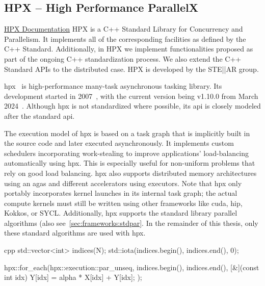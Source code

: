 \subsection{HPX -- High Performance ParallelX}
\label{sec:frameworks:hpx}

\begin{quotebox}{\href{https://hpx-docs.stellar-group.org/latest/html/index.html\#what-is-hpx}{HPX Documentation}}
    HPX is a C++ Standard Library for Concurrency and Parallelism. It implements all of the corresponding facilities as defined by the C++ Standard. Additionally, in HPX we implement functionalities proposed as part of the ongoing C++ standardization process. We also extend the C++ Standard APIs to the distributed case. HPX is developed by the STE||AR group.
\end{quotebox}

\acrfull{hpx}~\cite{kaiser_hpx_2020} is high-performance many-task asynchronous tasking library. 
Its development started in 2007~\cite{the_stear_group_history_nodate}, with the current version being v1.10.0 from March 2024~\cite{kaiser_stellar-grouphpx_2024}.
Although \gls{hpx} is not standardized where possible, its \gls{api} is closely modeled after the \cpp standard \gls{api}. 

The execution model of \gls{hpx} is based on a task graph that is implicitly built in the source code and later executed asynchronously. 
It implements custom schedulers incorporating work-stealing to improve applications' load-balancing automatically using \gls{hpx}. 
This is especially useful for non-uniform problems that rely on good load balancing. 
\gls{hpx} also supports distributed memory architectures using an \gls{agas} and different accelerators using executors. 
Note that \gls{hpx} only portably incorporates kernel launches in its internal task graph; the actual compute kernels must still be written using other frameworks like \gls{cuda}, \gls{hip}, Kokkos, or SYCL.  
Additionally, \gls{hpx} supports the  standard library parallel algorithms (also see~\autoref{sec:frameworks:stdpar}. 
In the remainder of this thesis, only these standard algorithms are used with \gls{hpx}. 


\begin{listing}
    \begin{moderncode}{cpp}
std::vector<int> indices(N);
std::iota(indices.begin(), indices.end(), 0);

hpx::for_each(hpx::execution::par_unseq, indices.begin(), indices.end(), [&](const int idx) {
    Y[idx] = alpha * X[idx] + Y[idx];
});
    \end{moderncode}
    \caption{%
    A simple DAXPY example using \gls{hpx} parallel loops.}
    \label{code:hpx_example}
\end{listing}


